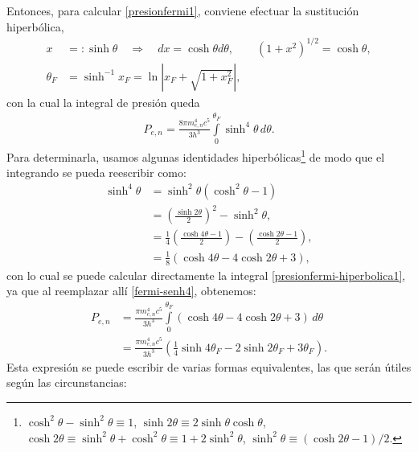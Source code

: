 Entonces, para calcular \eqref{presionfermi1}, conviene efectuar la sustitución hiperbólica,
\begin{align}\label{sust-hiperbolica}
 x&=:\sinh\theta\quad\Rightarrow\quad dx=\cosh\theta d\theta,\qquad \left(1+x^2\right)^{1/2}=\cosh\theta,\\
\theta_F&=\sinh^{-1}x_F=\ln\left|x_F+\sqrt{1+x_F^2}\right|,
\end{align}
con la cual la integral de presión queda
\begin{align}\label{presionfermi-hiperbolica1}
 P_{e,n}=\frac{8\pi m_{e,n}^4c^5}{3h^3}\int\limits_0^{\theta_F}\sinh^4\theta\, d\theta.
\end{align}
Para determinarla, usamos algunas identidades hiperbólicas\footnote{$\cosh^2\theta-\sinh^2\theta\equiv 1$, $\sinh2\theta\equiv 2\sinh\theta\cosh\theta$, $\cosh2\theta\equiv \sinh^2\theta+\cosh^2\theta\equiv 1+2\sinh^2\theta$, $\sinh^2\theta\equiv \left(\cosh2\theta-1\right)/2$.} de modo que el integrando se pueda reescribir como:
\begin{align}
 \sinh^4\theta &= \sinh^2\theta\left(\cosh^2\theta-1\right) \\
&=\left(\frac{\sinh 2\theta}{2}\right)^2-\sinh^2\theta,\\
&=\frac{1}{4}\left(\frac{\cosh4\theta-1}{2}\right)-\left(\frac{\cosh2\theta-1}{2}\right),\\
&=\frac{1}{8}\left(\cosh4\theta-4\cosh2\theta+3\right)\label{fermi-senh4},
\end{align}
con lo cual se puede calcular directamente la integral \eqref{presionfermi-hiperbolica1}, ya que al reemplazar allí \eqref{fermi-senh4}, obtenemos:
\begin{align}
 P_{e,n}&=\frac{\pi m_{e,n}^4c^5}{3h^3}\int\limits_0^{\theta_F}\left(\cosh4\theta-4\cosh2\theta+3\right)\, d\theta\\
&=\frac{\pi m_{e,n}^4c^5}{3h^3}\left(\frac{1}{4}\sinh4\theta_F-2\sinh2\theta_F+3\theta_F\right) .\label{presionfermi-hiperbolica2}
\end{align}
Esta expresión se puede escribir de varias formas equivalentes, las que serán útiles según las circunstancias:
